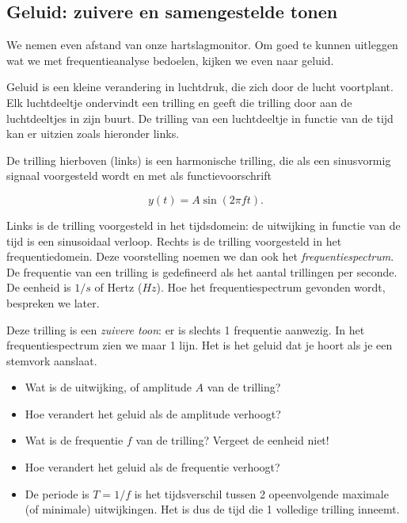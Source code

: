 \subsection{Geluid: zuivere en samengestelde tonen}

We nemen even afstand van onze hartslagmonitor. Om goed te kunnen uitleggen wat we met frequentieanalyse bedoelen, kijken we even naar geluid.

Geluid is een kleine verandering in luchtdruk, die zich door de lucht voortplant. Elk luchtdeeltje ondervindt een trilling en geeft die trilling door aan de luchtdeeltjes in zijn buurt. De trilling van een luchtdeeltje in functie van de tijd kan er uitzien zoals hieronder links.


De trilling hierboven (links) is een harmonische trilling, die als een sinusvormig signaal voorgesteld wordt en met als functievoorschrift 

\begin{equation*}
y(t) = A \sin(2\pi f t).
\end{equation*}

Links is de trilling voorgesteld in het tijdsdomein: de uitwijking in functie van de tijd is een sinusoidaal verloop. Rechts is de trilling voorgesteld in het frequentiedomein. Deze voorstelling noemen we dan ook het \emph{frequentiespectrum}. De frequentie van een trilling is gedefineerd als het aantal trillingen per seconde. De eenheid is $1/s$ of Hertz ($Hz$). Hoe het frequentiespectrum gevonden wordt, bespreken we later.

Deze trilling is een \emph{zuivere toon}: er is slechts 1 frequentie aanwezig. In het frequentiespectrum zien we maar 1 lijn. Het is het geluid dat je hoort als je een stemvork aanslaat.

\begin{oef}
\begin{itemize}
	\item Wat is de uitwijking, of amplitude $A$ van de trilling? 
	\item Hoe verandert het geluid als de amplitude verhoogt?
	\item Wat is de frequentie $f$ van de trilling? Vergeet de eenheid niet!
	\item Hoe verandert het geluid als de frequentie verhoogt?
	\item De periode is $T=1/f$ is het tijdsverschil tussen 2 opeenvolgende maximale (of minimale) uitwijkingen. Het is dus de tijd die 1 volledige trilling inneemt.
\end{itemize}
\end{oef}

